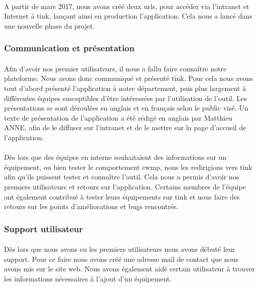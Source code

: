 \documentclass[12pt,a4paper]{report}
\begin{document}
\paragraph*{}A partir de mars 2017, nous avons créé deux \gls{url}s, pour accéder via l'intranet et Internet à \gls{tink}, lançant ainsi en production l'application. Cela nous a lancé dans une nouvelle phase du projet. 
\subsubsection{Communication et présentation}
\paragraph*{}Afin d'avoir nos premier utilisateurs, il nous a fallu faire connaître notre plateforme. Nous avons donc communiqué et présenté \gls{tink}. Pour cela nous avons tout d'abord présenté l'application à notre département, puis plus largement à différentes équipes susceptibles d'être intéressées par l'utilisation de l'outil. Les présentations se sont déroulées en anglais et en français selon le public visé. Un texte de présentation de l'application a été rédigé en anglais par Matthieu ANNE, afin de le diffuser sur l'intranet et de le mettre sur la page d'accueil de l'application. 
\paragraph*{}Dès lors que des équipes en interne souhaitaient des informations sur un équipement, ou bien tester le comportement \gls{cwmp}, nous les redirigions vers \gls{tink} afin qu'ils puissent tester et connaître l'outil. Cela nous a permis d'avoir nos premiers utilisateurs et retours sur l'application. Certains membres de l'équipe ont également contribué à tester leurs équipements sur \gls{tink} et nous faire des retours sur les points d'améliorations et bugs rencontrés. \\

\subsubsection{Support utilisateur}
\paragraph*{}Dès lors que nous avons eu les premiers utilisateurs nous avons débuté leur support. Pour ce faire nous avons créé une adresse mail de contact que nous avons mis sur le site web. Nous avons également aidé certain utilisateur à trouver les informations nécessaires à l'ajout d'un équipement.
\end{document}
